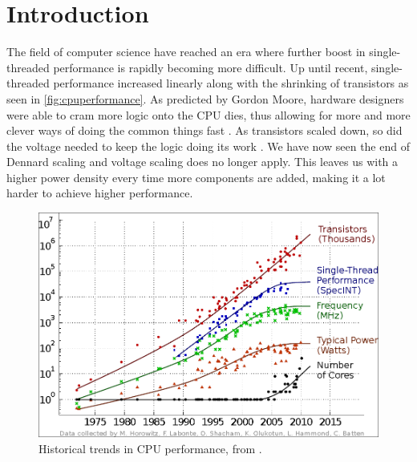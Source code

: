 \chapter{Introduction}

The field of computer science have reached an era where further boost in
single-threaded performance is rapidly becoming more difficult. Up until recent,
single-threaded performance increased linearly along with the shrinking of transistors as
seen in \autoref{fig:cpuperformance}.
As predicted by Gordon Moore, hardware designers were able to cram more logic
onto the CPU dies, thus allowing for more and more clever ways of doing the
common things fast \cite{moore1965cramming}. As transistors scaled down, so did
the voltage needed to keep the logic doing its work \cite{dennard1974design}. We
have now seen the end of Dennard scaling \cite{esmaeilzadeh2011dark} and voltage scaling
does no longer apply. This leaves us with a higher power density every time
more components are added, making it a lot harder to achieve higher performance.

\begin{figure}
    \includegraphics[width=\textwidth]{figs/cpu-performance.png}
    \caption{Historical trends in CPU performance, from \cite{salishan2011}.}
    \label{fig:cpuperformance}
\end{figure}







